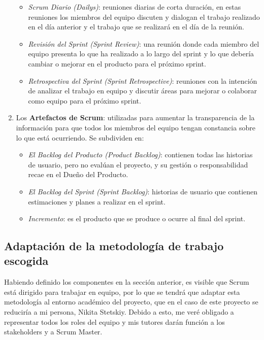 \begin{enumerate}
\begin{itemize}
            \item
            \textit{Scrum Diario (Dailys)}: reuniones diarias de corta duración, en estas reuniones los miembros del equipo discuten y dialogan el trabajo realizado en el día anterior y el trabajo que se realizará en el día de la reunión.
    
            \item
            \textit{Revisión del Sprint (Sprint Review)}: una reunión donde cada miembro del equipo presenta lo que ha realizado a lo largo del sprint y lo que debería cambiar o mejorar en el producto para el próximo sprint.

            \item
            \textit{Retrospectiva del Sprint (Sprint Retrospective)}: reuniones con la intención de analizar el trabajo en equipo y discutir áreas para mejorar o colaborar como equipo para el próximo sprint.
    
        \end{itemize}

    \item
    Los \textbf{Artefactos de Scrum}: utilizadas para aumentar la transparencia de la información para que todos los miembros del equipo tengan constancia sobre lo que está ocurriendo. Se subdividen en:
    
        \begin{itemize}
            \item
            \textit{El Backlog del Producto (Product Backlog)}: contienen todas las historias de usuario, pero no evalúan el proyecto, y su gestión o responsabilidad recae en el Dueño del Producto.
    
            \item
            \textit{El Backlog del Sprint (Sprint Backlog)}: historias de usuario que contienen estimaciones y planes a realizar en el sprint.
    
            \item
            \textit{Incremento}: es el producto que se produce o ocurre al final del sprint.
    
        \end{itemize}

\end{enumerate}

\vspace{0.3cm}

\subsection{Adaptación de la metodología de trabajo escogida}
Habiendo definido los componentes en la sección anterior, es visible que Scrum está dirigido para trabajar en equipo, por lo que se tendrá que adaptar esta metodología al entorno académico del proyecto, que en el caso de este proyecto se reduciría a mi persona, Nikita Stetskiy. Debido a esto, me veré obligado a representar todos los roles del equipo y mis tutores darán función a los stakeholders y a Scrum Master.

